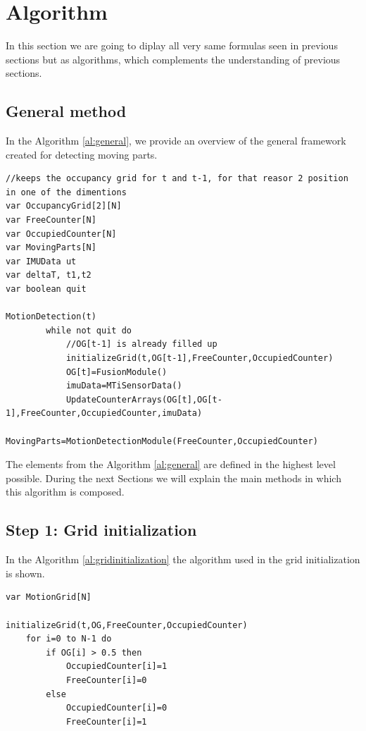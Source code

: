 \section{Algorithm}

In this section we are going to diplay all very same formulas seen in previous sections but as algorithms, which complements the understanding of previous sections.

\subsection{General method}

In the Algorithm \ref{al:general}, we provide an overview of the general framework created for detecting moving parts.

\begin{lstlisting}[title={Algorithm},label=al:general,caption={General framework algorithm for motion detection}]
//keeps the occupancy grid for t and t-1, for that reasor 2 position in one of the dimentions
var OccupancyGrid[2][N]
var FreeCounter[N] 
var OccupiedCounter[N] 
var MovingParts[N]
var IMUData ut
var deltaT, t1,t2
var boolean quit

MotionDetection(t)
		while not quit do
			//OG[t-1] is already filled up 		
			initializeGrid(t,OG[t-1],FreeCounter,OccupiedCounter)
			OG[t]=FusionModule()
			imuData=MTiSensorData()
			UpdateCounterArrays(OG[t],OG[t-1],FreeCounter,OccupiedCounter,imuData)
			MovingParts=MotionDetectionModule(FreeCounter,OccupiedCounter)
\end{lstlisting}

The elements from the Algorithm \ref{al:general} are defined in the highest level possible. During the next Sections we will explain the main methods in which this algorithm is composed.

\subsection{Step 1: Grid initialization}

In the Algorithm \ref{al:gridinitialization} the algorithm used in the grid initialization is shown.

\begin{lstlisting}[title={Algorithm},label=al:gridinitialization,caption={Grid initialization}]
var MotionGrid[N]

initializeGrid(t,OG,FreeCounter,OccupiedCounter)
	for i=0 to N-1 do
		if OG[i] > 0.5 then 
			OccupiedCounter[i]=1
			FreeCounter[i]=0
		else
			OccupiedCounter[i]=0
			FreeCounter[i]=1

\end{lstlisting}

